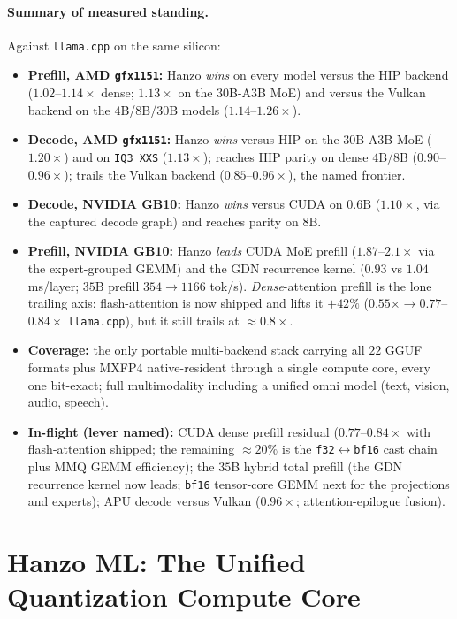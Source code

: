 \documentclass[11pt]{article}
\begin{document}
\paragraph{Summary of measured standing.} Against \texttt{llama.cpp} on the same silicon:
\begin{itemize}
  \item \textbf{Prefill, AMD \texttt{gfx1151}:} Hanzo \emph{wins} on every model versus the HIP
  backend ($1.02$--$1.14\times$ dense; $1.13\times$ on the $30$B-A3B MoE) and versus the Vulkan
  backend on the $4$B/$8$B/$30$B models ($1.14$--$1.26\times$).
  \item \textbf{Decode, AMD \texttt{gfx1151}:} Hanzo \emph{wins} versus HIP on the $30$B-A3B MoE
  ($1.20\times$) and on \texttt{IQ3\_XXS} ($1.13\times$); reaches HIP parity on dense $4$B/$8$B
  ($0.90$--$0.96\times$); trails the Vulkan backend ($0.85$--$0.96\times$), the named frontier.
  \item \textbf{Decode, NVIDIA GB10:} Hanzo \emph{wins} versus CUDA on $0.6$B ($1.10\times$, via the
  captured decode graph) and reaches parity on $8$B.
  \item \textbf{Prefill, NVIDIA GB10:} Hanzo \emph{leads} CUDA MoE prefill ($1.87$--$2.1\times$ via the
  expert-grouped GEMM) and the GDN recurrence kernel ($0.93$ vs $1.04$ ms/layer; $35$B prefill
  $354 \to 1166$ tok/s). \emph{Dense}-attention prefill is the lone trailing axis: flash-attention is
  now shipped and lifts it $+42\%$ ($0.55\times \to 0.77$--$0.84\times$ \texttt{llama.cpp}), but it
  still trails at $\approx 0.8\times$.
  \item \textbf{Coverage:} the only portable multi-backend stack carrying all $22$ GGUF formats plus
  MXFP4 native-resident through a single compute core, every one bit-exact; full multimodality
  including a unified omni model (text, vision, audio, speech).
  \item \textbf{In-flight (lever named):} CUDA dense prefill residual ($0.77$--$0.84\times$ with
  flash-attention shipped; the remaining $\approx 20\%$ is the \texttt{f32}$\leftrightarrow$\texttt{bf16}
  cast chain plus MMQ GEMM efficiency); the $35$B hybrid total prefill (the GDN recurrence kernel now
  leads; \texttt{bf16} tensor-core GEMM next for the projections and experts); APU decode versus Vulkan
  ($0.96\times$; attention-epilogue fusion).
\end{itemize}

\section{Hanzo ML: The Unified Quantization Compute Core}
\label{sec:ml}
\end{document}
